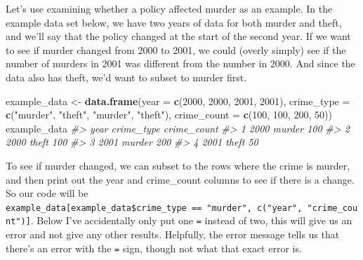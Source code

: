 \documentclass[
  12pt,
]{book}
\newenvironment{Shaded}{\begin{snugshade}}{\end{snugshade}}
\newcommand{\CommentTok}[1]{\textcolor[rgb]{0.37,0.37,0.37}{\textit{#1}}}
\newcommand{\DataTypeTok}[1]{\textcolor[rgb]{0.27,0.27,0.27}{#1}}
\newcommand{\DecValTok}[1]{\textcolor[rgb]{0.06,0.06,0.06}{#1}}
\newcommand{\KeywordTok}[1]{\textcolor[rgb]{0.27,0.27,0.27}{\textbf{#1}}}
\newcommand{\NormalTok}[1]{#1}
\newcommand{\OperatorTok}[1]{\textcolor[rgb]{0.43,0.43,0.43}{\textbf{#1}}}
\newcommand{\StringTok}[1]{\textcolor[rgb]{0.5,0.5,0.5}{#1}}
\begin{document}
Let's use examining whether a policy affected murder as an example. In the example data set below, we have two years of data for both murder and theft, and we'll say that the policy changed at the start of the second year. If we want to see if murder changed from 2000 to 2001, we could (overly simply) see if the number of murders in 2001 was different from the number in 2000. And since the data also has theft, we'd want to subset to murder first.

\begin{Shaded}
\begin{Highlighting}[]
\NormalTok{example\_data <{-}}\StringTok{ }\KeywordTok{data.frame}\NormalTok{(}\DataTypeTok{year =} \KeywordTok{c}\NormalTok{(}\DecValTok{2000}\NormalTok{, }\DecValTok{2000}\NormalTok{, }\DecValTok{2001}\NormalTok{, }\DecValTok{2001}\NormalTok{),}
                           \DataTypeTok{crime\_type =} \KeywordTok{c}\NormalTok{(}\StringTok{"murder"}\NormalTok{, }\StringTok{"theft"}\NormalTok{, }\StringTok{"murder"}\NormalTok{, }\StringTok{"theft"}\NormalTok{),}
                           \DataTypeTok{crime\_count =} \KeywordTok{c}\NormalTok{(}\DecValTok{100}\NormalTok{, }\DecValTok{100}\NormalTok{, }\DecValTok{200}\NormalTok{, }\DecValTok{50}\NormalTok{))}
\NormalTok{example\_data}
\CommentTok{\#>   year crime\_type crime\_count}
\CommentTok{\#> 1 2000     murder         100}
\CommentTok{\#> 2 2000      theft         100}
\CommentTok{\#> 3 2001     murder         200}
\CommentTok{\#> 4 2001      theft          50}
\end{Highlighting}
\end{Shaded}

To see if murder changed, we can subset to the rows where the crime is murder, and then print out the year and crime\_count columns to see if there is a change. So our code will be \texttt{example\_data{[}example\_data\$crime\_type\ ==\ "murder",\ c("year",\ "crime\_count"){]}}. Below I've accidentally only put one \texttt{=} instead of two, this will give us an error and not give any other results. Helpfully, the error message tells us that there's an error with the \texttt{=} sign, though not what that exact error is.

\begin{Shaded}
\begin{Highlighting}[]
\NormalTok{example\_data[example\_data}\OperatorTok{$}\NormalTok{crime\_type =}\StringTok{ "murder"}\NormalTok{, }\KeywordTok{c}\NormalTok{(}\StringTok{"year"}\NormalTok{, }\StringTok{"crime\_count"}\NormalTok{)]}
\CommentTok{\#> Error: <text>:1:38: unexpected \textquotesingle{}=\textquotesingle{}}
\CommentTok{\#> 1: example\_data[example\_data$crime\_type =}
\CommentTok{\#>                                          \^{}}
\end{Highlighting}
\end{Shaded}
\end{document}
